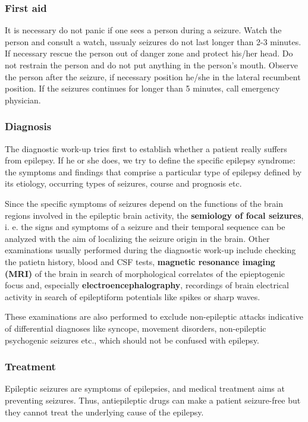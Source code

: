 \documentclass[12pt,article,oneside,a4paper]{memoir}
\begin{document}
\subsubsection{First aid}
It is necessary do not panic if one sees a person during a seizure. Watch the
person and consult a watch, ussualy seizures do not last longer than 2-3 minutes.
If necessary rescue the person out of danger zone and protect his/her head.
Do not restrain the person and do not put anything in the person's mouth.
Observe the person after the seizure, if necessary position he/she in the lateral
recumbent position. If the seizures continues for longer than 5 minutes, call
emergency physician.

\subsubsection{Diagnosis}

The diagnostic work-up tries first to establish whether a patient really suffers
from epilepsy. If he or she does, we try to define the specific epilepsy
syndrome: the symptoms and findings that comprise a particular type of epilepsy
defined by its etiology, occurring types of seizures, course and prognosis etc.

Since the specific symptoms of seizures depend on the functions of the brain
regions involved in the epileptic brain activity, the \textbf{semiology of focal
seizures}, i. e. the signs and symptoms of a seizure and their temporal sequence
can be analyzed with the aim of localizing the seizure origin in the brain.
Other examinations usually performed during the diagnostic work-up include
checking the patietn history, blood and CSF tests, \textbf{magnetic resonance
imaging (MRI)} of the brain in search of morphological correlates of the
epieptogenic focus and, especially \textbf{electroencephalography}, recordings
of brain electrical activity in search of epileptiform potentials like spikes
or sharp waves.

These examinations are also performed to exclude non-epileptic attacks
indicative of differential diagnoses like syncope, movement disorders,
non-epileptic psychogenic seizures etc., which should not be confused with
epilepsy.

\subsubsection{Treatment}

Epileptic seizures are symptoms of epilepsies, and medical treatment aims at
preventing seizures. Thus, antiepileptic drugs can make a patient seizure-free
but they cannot treat the underlying cause of the epilepsy. 
\end{document}
